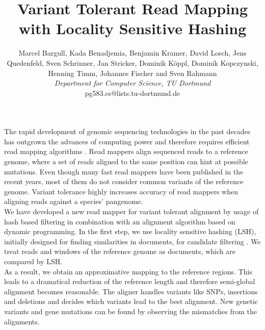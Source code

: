 \documentclass[english]{short}
\title{Variant Tolerant Read Mapping with Locality Sensitive Hashing}
\author{Marcel Bargull, Kada Benadjemia, Benjamin Kramer, David Losch, Jens Quedenfeld, Sven Schrinner, Jan Stricker, Dominik K{\"o}ppl, Dominik Kopczynski, Henning Timm, Johannes Fischer and Sven Rahmann\\
{\normalsize\it Department for Computer Science, TU Dortmund}\\
pg583.cs@lists.tu-dortmund.de}
\begin{document}
\maketitle
The rapid development of genomic sequencing technologies in the past decades has outgrown the advances of computing power and therefore requires efficient read mapping algorithms \cite{Loh2012}. Read mappers align sequenced reads to a reference genome, where a set of reads aligned to the same position can hint at possible mutations. Even though many fast read mappers have been published in the recent years, most of them do not consider common variants of the reference genome.
Variant tolerance highly increases accuracy of read mappers when aligning reads against a species' pangenome. \\
We have developed a new read mapper for variant tolerant alignment by usage of hash based filtering in combination with an alignment algorithm based on dynamic programming. In the first step, we use locality sensitive hashing (LSH), initially designed for finding similarities in documents, for candidate filtering \cite{Adoni2006}. We treat reads and windows of the reference genome as documents, which are compared by LSH.\\
As a result, we obtain an approximative mapping to the reference regions. This leads to a dramatical reduction of the reference length and therefore semi-global alignment becomes reasonable. The aligner handles variants like SNPs, insertions and deletions and decides which variants lead to the best alignment.
New genetic variants and gene mutations can be found by observing the mismatches from the alignments.

\end{document}

